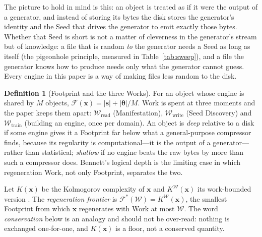 \documentclass[11pt,a4paper]{article}
\theoremstyle{definition}
\newtheorem{definition}{Definition}[section]
\theoremstyle{plain}
\theoremstyle{remark}
\newcommand{\Foot}{\mathcal{F}}
\newcommand{\Work}{\mathcal{W}}
\newcommand{\KC}{K}
\newcommand{\seed}{\mathbf{s}}
\newcommand{\weights}{\bm{\theta}}
\newcommand{\file}{\mathbf{x}}
\begin{document}
The picture to hold in mind is this: an object is treated as if it were the output of a
generator, and instead of storing its bytes the disk stores the generator's identity and the
Seed that drives the generator to emit exactly those bytes. Whether that Seed is short is not a
matter of cleverness in the generator's stream but of knowledge: a file that is random \emph{to}
the generator needs a Seed as long as itself (the pigeonhole principle, measured in
Table~\ref{tab:sweep}), and a file the generator knows how to produce needs only what the
generator cannot guess. Every engine in this paper is a way of making files less random to the
disk.

\begin{definition}[Footprint and the three Works]
For an object whose engine is shared by $M$ objects, $\Foot(\file)=|\seed|+|\weights|/M$. Work is
spent at three moments and the paper keeps them apart: $\Work_{\mathrm{read}}$ (Manifestation),
$\Work_{\mathrm{write}}$ (Seed Discovery) and $\Work_{\mathrm{train}}$ (building an engine, once
per domain). An object is \emph{deep} relative to a disk if some engine gives it a Footprint far
below what a general-purpose compressor finds, because its regularity is computational---it is
the output of a generator---rather than statistical; \emph{shallow} if no engine beats the raw
bytes by more than such a compressor does. Bennett's logical depth \citep{bennett1988} is the
limiting case in which regeneration Work, not only Footprint, separates the two.
\end{definition}

Let $\KC(\file)$ be the Kolmogorov complexity of $\file$
\citep{kolmogorov1965,chaitin1966,solomonoff1964,livitanyi2008} and $\KC^{\Work}(\file)$ its
work-bounded version \citep{levin1973,hartmanis1983}. The \emph{regeneration frontier} is
$\Foot^{*}(\Work)=\KC^{\Work}(\file)$, the smallest Footprint from which $\file$ regenerates with
Work at most $\Work$. The word \emph{conservation} below is an analogy and should not be
over-read: nothing is exchanged one-for-one, and $\KC(\file)$ is a floor, not a conserved
quantity.
\end{document}
